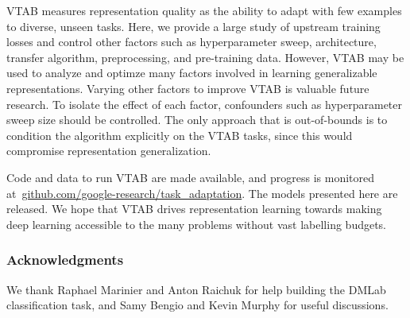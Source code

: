 VTAB measures representation quality as the ability to adapt with few examples to diverse, unseen tasks. Here, we provide a large study of upstream training losses and control other factors such as hyperparameter sweep, architecture, transfer algorithm, preprocessing, and pre-training data. However, VTAB may be used to analyze and optimze many factors involved in learning generalizable representations. Varying other factors to improve VTAB is valuable future research. To isolate the effect of each factor, confounders such as hyperparameter sweep size should be controlled. The only approach that is out-of-bounds is to condition the algorithm explicitly on the VTAB tasks, since this would compromise representation generalization.

Code and data to run VTAB are made available, and progress is monitored at~\url{github.com/google-research/task_adaptation}.
The models presented here are released. We hope that VTAB drives representation learning towards making deep learning accessible to the many problems without vast labelling budgets.

\subsubsection*{Acknowledgments}
We thank Raphael Marinier and Anton Raichuk for help building the DMLab classification task, and Samy Bengio and Kevin Murphy for useful discussions.


